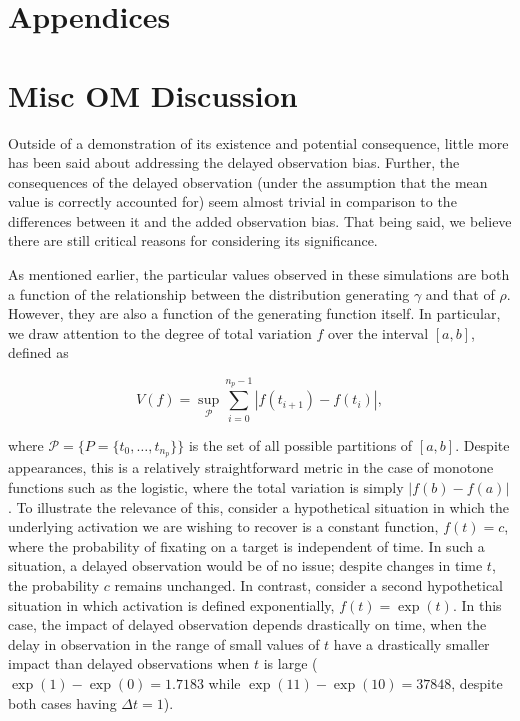 \documentclass{article}
\begin{document}
\section*{Appendices}


\section{Misc OM Discussion}


Outside of a demonstration of its existence and potential consequence, little more has been said about addressing the delayed observation bias. Further, the consequences of the delayed observation (under the assumption that the mean value is correctly accounted for) seem almost trivial in comparison to the differences between it and the added observation bias. That being said, we believe there are still critical reasons for considering its significance.

As mentioned earlier, the particular values observed in these simulations are both a function of the relationship between the distribution generating $\gamma$ and that of $\rho$. However, they are also a function of the generating function itself. In particular, we draw attention to the degree of total variation $f$ over the interval $[a,b]$, defined as 

\begin{equation}
V(f) = \underset{\mathcal{P}}{\sup} \sum_{i=0}^{n_p-1} \left|f(t_{i+1}) - f(t_i) \right|,
\end{equation}

where $\mathcal{P} = \{P = \{t_0, \dots, t_{n_p}\} \}$ is the set of all possible partitions of $[a,b]$. Despite appearances, this is a relatively straightforward metric in the case of monotone functions such as the logistic, where the total variation is simply $|f(b) - f(a)|$. To illustrate the relevance of this, consider a hypothetical situation in which the underlying activation we are wishing to recover is a constant function, $f(t) = c$, where the probability of fixating on a target is independent of time. In such a situation, a delayed observation would be of no issue; despite changes in time $t$, the probability $c$ remains unchanged. In contrast, consider a second hypothetical situation in which activation is defined exponentially, $f(t) = \exp(t)$. In this case, the impact of delayed observation depends drastically on time, when the delay in observation in the range of small values of $t$ have a drastically smaller impact than delayed observations when $t$ is large ($\exp(1) - \exp(0) = 1.7183$ while $\exp(11) - \exp(10) = 37848$, despite both cases having $\Delta t = 1$).
\end{document}
